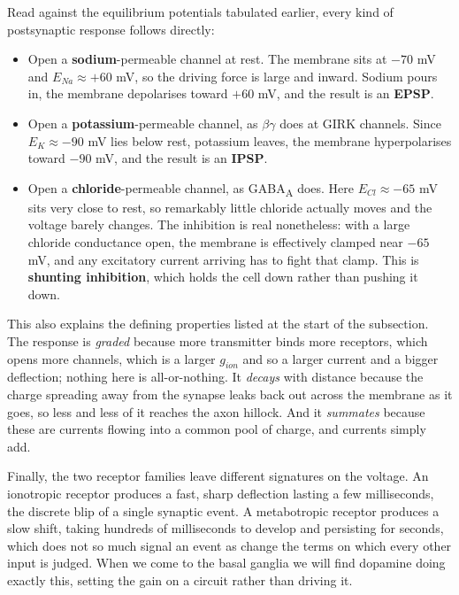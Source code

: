 \documentclass[11pt]{article}
\begin{document}
Read against the equilibrium potentials tabulated earlier, every kind of postsynaptic response follows directly:

\begin{itemize}
    \item Open a \textbf{sodium}-permeable channel at rest. The membrane sits at $-70$ mV and $E_{Na} \approx +60$ mV, so the driving force is large and inward. Sodium pours in, the membrane depolarises toward $+60$ mV, and the result is an \textbf{EPSP}.
    \item Open a \textbf{potassium}-permeable channel, as $\beta\gamma$ does at GIRK channels. Since $E_K \approx -90$ mV lies below rest, potassium leaves, the membrane hyperpolarises toward $-90$ mV, and the result is an \textbf{IPSP}.
    \item Open a \textbf{chloride}-permeable channel, as GABA\textsubscript{A} does. Here $E_{Cl} \approx -65$ mV sits very close to rest, so remarkably little chloride actually moves and the voltage barely changes. The inhibition is real nonetheless: with a large chloride conductance open, the membrane is effectively clamped near $-65$ mV, and any excitatory current arriving has to fight that clamp. This is \textbf{shunting inhibition}, which holds the cell down rather than pushing it down.
\end{itemize}

This also explains the defining properties listed at the start of the subsection. The response is \textit{graded} because more transmitter binds more receptors, which opens more channels, which is a larger $g_{ion}$ and so a larger current and a bigger deflection; nothing here is all-or-nothing. It \textit{decays} with distance because the charge spreading away from the synapse leaks back out across the membrane as it goes, so less and less of it reaches the axon hillock. And it \textit{summates} because these are currents flowing into a common pool of charge, and currents simply add.

Finally, the two receptor families leave different signatures on the voltage. An ionotropic receptor produces a fast, sharp deflection lasting a few milliseconds, the discrete blip of a single synaptic event. A metabotropic receptor produces a slow shift, taking hundreds of milliseconds to develop and persisting for seconds, which does not so much signal an event as change the terms on which every other input is judged. When we come to the basal ganglia we will find dopamine doing exactly this, setting the gain on a circuit rather than driving it.
\end{document}
